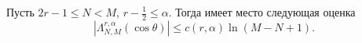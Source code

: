 \begin{lemma} Пусть $2r-1\le N< M$, $r-\frac12\le\alpha$. Тогда имеет место следующая оценка
\begin{equation}\label{5.8}
 |\Lambda^{r,\alpha}_{N,M}(\cos\theta)|\le  c(r,\alpha)\ln(M-N+1).
 \end{equation}
\end{lemma}
